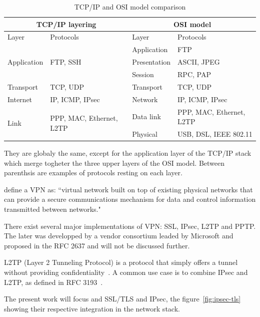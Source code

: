\begin{table}[ht]
\center
\begin{tabularx}{\textwidth}{|l|l|l|X|} \hline
\multicolumn{2}{|c|}{TCP/IP layering} & \multicolumn{2}{c|}{OSI model} \\ \hline
Layer & Protocols & Layer & Protocols \\ \hline
\multirow{3}{*}{Application} & \multirow{3}{*}{FTP, SSH} & Application & FTP \\ \cline{3-4}
 & & Presentation & ASCII, JPEG \\ \cline{3-4}
 & & Session & RPC, PAP \\ \hline
Transport & TCP, UDP & Transport & TCP, UDP \\ \hline
Internet & IP, ICMP, IPsec & Network & IP, ICMP, IPsec \\ \hline
\multirow{2}{*}{Link} & \multirow{2}{*}{PPP, MAC, Ethernet, L2TP} & Data link & PPP, MAC, Ethernet, L2TP \\ \cline{3-4}
 & & Physical & USB, DSL, IEEE 802.11 \\ \hline
\end{tabularx}
\caption{TCP/IP and OSI model comparison}{They are globaly the same, except for the application layer of the TCP/IP stack which merge togheter the three upper layers of the OSI model. Between parenthsis are examples of protocols resting on each layer.}
\label{tab:tcp-ip-stack}
\end{table}


\citet{Frankel:2005:SGI:2206289} define a VPN as: ``virtual network built on top of existing physical networks that can provide a
secure communications mechanism for data and control information transmitted between networks."

There exist several major implementations of VPN: SSL, IPsec, L2TP and PPTP.
The later was developped by a vendor consortium leaded by Microsoft and proposed in the RFC 2637 and will not be discussed further.

\noindent L2TP (Layer 2 Tunneling Protocol) is a protocol that simply offers a tunnel without providing confidentiality~\cite{rfc3931}.
A common use case is to combine IPsec and L2TP, as defined in RFC 3193~\cite{rfc3193}.\newline{}

The present work will focus and SSL/TLS and IPsec, the figure~\ref{fig:ipsec-tls} showing their respective integration in the network stack.

\begin{figure}[ht]
\center

\caption{}{}
\label{fig:tls-ipsec}
\end{figure}

